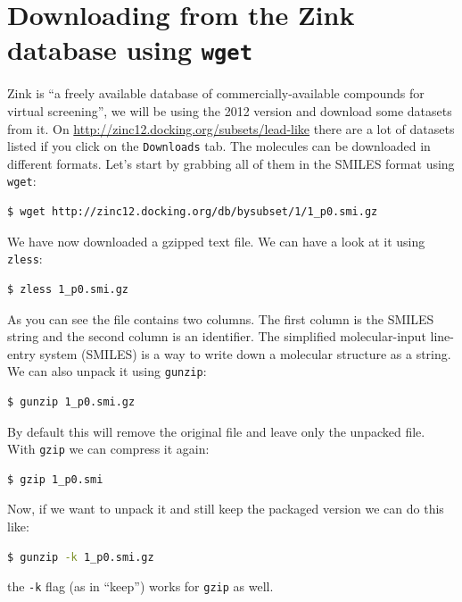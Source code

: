 \documentclass[watermark]{pbpreprint}
\begin{document}
\section{Downloading from the Zink database using \texttt{wget}}
Zink is ``a freely available database of commercially-available compounds for
virtual screening'', we will be using the 2012 version and download some
datasets from it. On \url{http://zinc12.docking.org/subsets/lead-like} there
are a lot of datasets listed if you click on the \texttt{Downloads} tab. The
molecules can be downloaded in different formats. Let's start by grabbing all
of them in the SMILES format using \texttt{wget}:
\begin{lstlisting}[language=bash]
$ wget http://zinc12.docking.org/db/bysubset/1/1_p0.smi.gz
\end{lstlisting}
We have now downloaded a gzipped text file. We can have a look at it using
\texttt{zless}:
%
\begin{lstlisting}[language=bash]
$ zless 1_p0.smi.gz
\end{lstlisting}
As you can see the file contains two columns. The first column is the SMILES
string and the second column is an identifier. The simplified molecular-input
line-entry system (SMILES) is a way to write down a molecular structure as a
string. We can also unpack it using \texttt{gunzip}:%
%
\begin{lstlisting}[language=bash]
$ gunzip 1_p0.smi.gz
\end{lstlisting}
By default this will remove the original file and leave only the unpacked
file. With \texttt{gzip} we can compress it again:
%
\begin{lstlisting}[language=bash]
$ gzip 1_p0.smi
\end{lstlisting}
Now, if we want to unpack it and still keep the packaged version we can do this like:
\begin{lstlisting}[language=bash]
$ gunzip -k 1_p0.smi.gz
\end{lstlisting}
the \texttt{-k} flag (as in ``keep'') works for \texttt{gzip} as well. 
\end{document}
